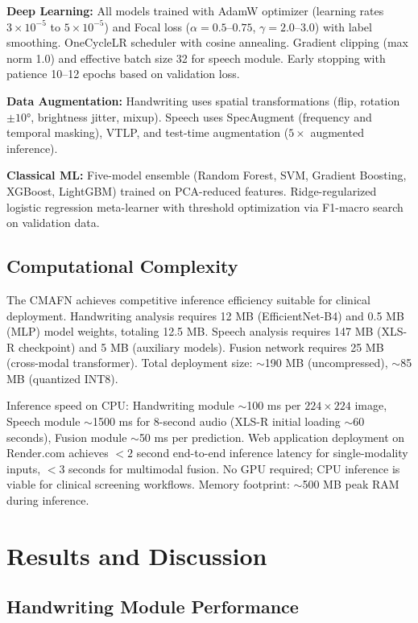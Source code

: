 \documentclass[10pt,conference,letterpaper]{IEEEtran}
\begin{document}
\textbf{Deep Learning:} All models trained with AdamW optimizer (learning rates $3 \times 10^{-5}$ to $5 \times 10^{-5}$) and Focal loss ($\alpha=0.5$--$0.75$, $\gamma=2.0$--$3.0$) with label smoothing. OneCycleLR scheduler with cosine annealing. Gradient clipping (max norm 1.0) and effective batch size 32 for speech module. Early stopping with patience 10--12 epochs based on validation loss.

\textbf{Data Augmentation:} Handwriting uses spatial transformations (flip, rotation $\pm 10°$, brightness jitter, mixup). Speech uses SpecAugment (frequency and temporal masking), VTLP, and test-time augmentation ($5\times$ augmented inference).

\textbf{Classical ML:} Five-model ensemble (Random Forest, SVM, Gradient Boosting, XGBoost, LightGBM) trained on PCA-reduced features. Ridge-regularized logistic regression meta-learner with threshold optimization via F1-macro search on validation data.

\subsection{Computational Complexity}

The CMAFN achieves competitive inference efficiency suitable for clinical deployment. Handwriting analysis requires 12 MB (EfficientNet-B4) and 0.5 MB (MLP) model weights, totaling 12.5 MB. Speech analysis requires 147 MB (XLS-R checkpoint) and 5 MB (auxiliary models). Fusion network requires 25 MB (cross-modal transformer). Total deployment size: $\sim$190 MB (uncompressed), $\sim$85 MB (quantized INT8).

Inference speed on CPU: Handwriting module $\sim$100 ms per $224 \times 224$ image, Speech module $\sim$1500 ms for 8-second audio (XLS-R initial loading $\sim$60 seconds), Fusion module $\sim$50 ms per prediction. Web application deployment on Render.com achieves $<2$ second end-to-end inference latency for single-modality inputs, $<3$ seconds for multimodal fusion. No GPU required; CPU inference is viable for clinical screening workflows. Memory footprint: $\sim$500 MB peak RAM during inference.

\section{Results and Discussion}

\subsection{Handwriting Module Performance}
\end{document}
